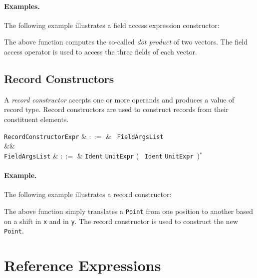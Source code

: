 \paragraph{Examples.}  The following example illustrates a field access expression constructor:



The above function computes the so-called {\em dot product} of two vectors.  The field access operator is used to access the three fields of each vector. 


\subsection{Record Constructors}
\label{c_expr_record_constructor}
A {\em record constructor} accepts one or more operands and produces a value of record type.  Record constructors are used to construct records from their constituent elements.  

\begin{syntax}
  \verb+RecordConstructorExpr+ & $::=$ & \token{\{}\ \verb+FieldArgsList+\ \token{\}}\\
&&\\
  \verb+FieldArgsList+ & $::=$ & \verb+Ident+ \token{:} \verb+UnitExpr+ \big(\ \token{,} \verb+Ident+ \token{:} \verb+UnitExpr+\ \big)$^*$\\
\end{syntax}

\paragraph{Example.} The following example illustrates a record constructor:



The above function simply translates a \lstinline{Point} from one position to another based on a shift in \lstinline{x} and in \lstinline{y}.  The record constructor is used to construct the new \lstinline{Point}.

\section{Reference Expressions}

